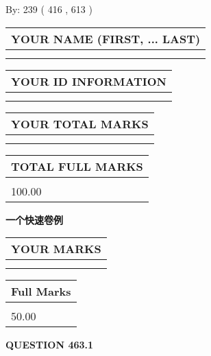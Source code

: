 \documentclass{ctexart}
\begin{document}
   
\hspace{1.0in} By: 
 239 ( 416 ,  613 )
   
   
   
   
\newpage 
\setcounter{page}{ 
   463001 } 
   
   
   
   
\noindent\begin{tabular}{|l|}
\hline
YOUR NAME (FIRST, ... LAST)  \\
\hline
 \\ 
 \\ 
\hline
\end{tabular}
\hspace{0.05in} \begin{tabular}{|l|}
\hline
 YOUR   ID   INFORMATION  \\
\hline
 \\ 
 \\ 
\hline
\end{tabular}
   
   
\vspace{0.2in}\noindent\begin{tabular}{|l|}
\hline
YOUR TOTAL MARKS  \\
\hline
 \\ 
 \\ 
\hline
\end{tabular}
\hspace{0.05in} \begin{tabular}{|l|}
\hline
TOTAL FULL MARKS  \\
\hline
 \\ 
100.00 \\
\hline
\end{tabular}
   
   
 \vspace{0.2in}
{\LARGE {\textbf{ 一个快速卷例}}}
   
   
  
\vspace{0.2in}
  
\noindent\begin{tabular}{|l|}
\hline
 YOUR MARKS  \\
\hline
 \\ 
 \\ 
\hline
\end{tabular}
\hspace{0.05in} \begin{tabular}{|l|}
\hline
 Full Marks  \\
\hline
 \\ 
50.00 \\
\hline
\end{tabular}
{\textbf{\Large{QUESTION
463.1 
}}}
  
\end{document}
